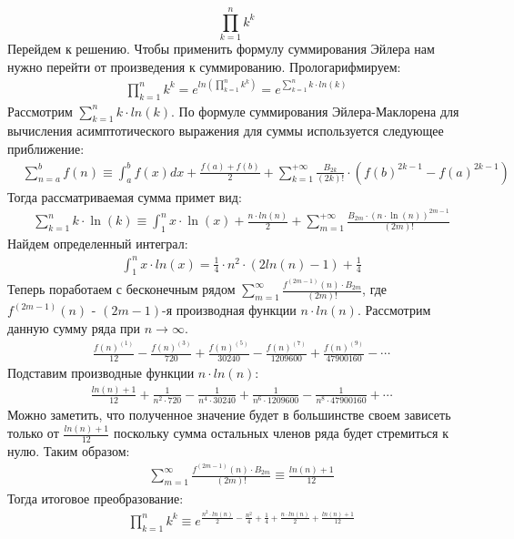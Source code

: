 \documentclass[a4paper,12pt,numbers=noenddot]{scrreprt}
\begin{document}
\begin{flushleft}
\begin{equation}
\prod_{k=1}^{n} k^k
\end{equation}
Перейдем к решению. Чтобы применить формулу суммирования Эйлера нам нужно перейти от произведения к суммированию. Прологарифмируем:
\begin{align}
\prod_{k=1}^{n} k^k=e^{ln(\prod_{k=1}^{n} k^k)} = e^{\sum_{k=1}^{n} k\cdot ln(k)}
\end{align}
Рассмотрим $\sum_{k=1}^{n} k\cdot ln(k)$. По формуле суммирования Эйлера-Маклорена для вычисления асимптотического выражения для суммы используется следующее приближение:
\begin{align}
& \sum_{n=a}^b f(n) \equiv \int_a^b f(x)dx + \frac{f(a)+f(b)}{2}+\sum_{k=1}^{+\infty} \frac{B_{2k}}{(2k)!} \cdot (f(b)^{2k-1}-f(a)^{2k-1})
\end{align}
Тогда рассматриваемая сумма примет вид:
\begin{align}
& \sum_{k=1}^{n} k\cdot \ln(k) \equiv \int_1^n x\cdot \ln(x) + \frac{n \cdot ln(n)}{2} + \sum_{m=1}^{+\infty} \frac{B_{2m}\cdot (n \cdot \ln(n))^{2m-1}}{(2m)!}
\end{align}
Найдем определенный интеграл:
\begin{align}
& \int_1^n x\cdot ln(x) = \frac{1}{4} \cdot n^2 \cdot (2 ln(n)-1) + \frac{1}{4}
\end{align}
Теперь поработаем с бесконечным рядом $\sum_{m=1}^\infty \frac{f^{(2m-1)}(n) \cdot B_{2m}}{(2m)!}$, где $f^{(2m-1)}(n)$ - $(2m-1)$-я производная функции $n \cdot ln(n)$. Рассмотрим данную сумму ряда при $n \rightarrow \infty$.
\begin{align}
& \frac{f(n)^{(1)}}{12} - \frac{f(n)^{(3)}}{720} + \frac{f(n)^{(5)}}{30240} - \frac{f(n)^{(7)}}{1209600} + \frac{f(n)^{(9)}}{47900160} - \cdots
\end{align}
Подставим производные функции $n \cdot ln(n)$:
\begin{align}
& \frac{ln(n)+1}{12} + \frac{1}{n^2 \cdot 720} - \frac{1}{n^4 \cdot 30240} + \frac{1}{n^6 \cdot 1209600} - \frac{1}{n^8 \cdot 47900160} + \cdots
\end{align}
Можно заметить, что полученное значение будет в большинстве своем зависеть только от $\frac{ln(n)+1}{12}$ поскольку сумма остальных членов ряда будет стремиться к нулю. Таким образом: 
\begin{align}
& \sum_{m=1}^\infty \frac{f^{(2m-1)}(n) \cdot B_{2m}}{(2m)!} \equiv \frac{ln(n)+1}{12}
\end{align}
Тогда итоговое преобразование:
\begin{align}   
& \prod_{k=1}^{n} k^k \equiv e^{\frac{n^2 \cdot ln(n)}{2}-\frac{n^2}{4}+\frac{1}{4} + \frac{n \cdot ln(n)}{2}+\frac{ln(n)+1}{12}}
\end{align}
\end{flushleft}
\end{document}
